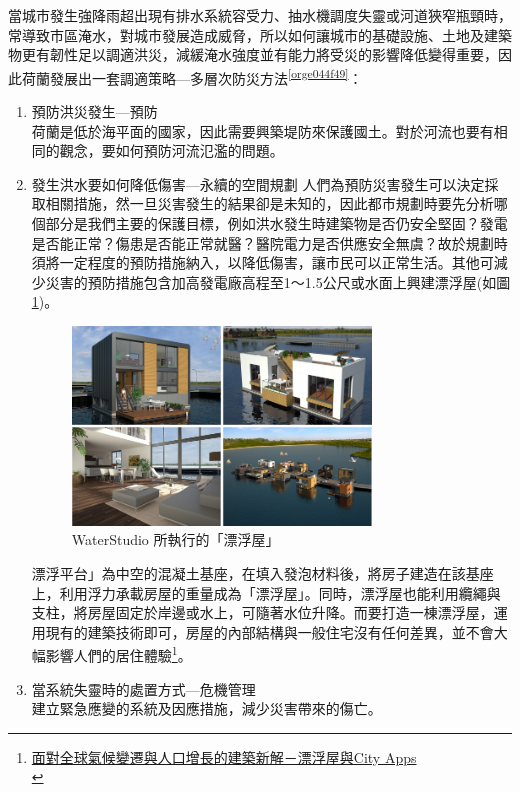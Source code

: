 \documentclass[a4paper,12pt]{article}
\begin{document}
\begin{enumerate}
\begin{enumerate}
當城市發生強降雨超出現有排水系統容受力、抽水機調度失靈或河道狹窄瓶頸時，常導致市區淹水，對城市發展造成威脅，所以如何讓城市的基礎設施、土地及建築物更有韌性足以調適洪災，減緩淹水強度並有能力將受災的影響降低變得重要，因此荷蘭發展出一套調適策略—多層次防災方法\textsuperscript{\ref{orge044f49}}：\\
\begin{enumerate}
\item 預防洪災發生—預防\\
荷蘭是低於海平面的國家，因此需要興築堤防來保護國土。對於河流也要有相同的觀念，要如何預防河流氾濫的問題。\\
\item 發生洪水要如何降低傷害—永續的空間規劃   人們為預防災害發生可以決定採取相關措施，然一旦災害發生的結果卻是未知的，因此都市規劃時要先分析哪個部分是我們主要的保護目標，例如洪水發生時建築物是否仍安全堅固？發電是否能正常？傷患是否能正常就醫？醫院電力是否供應安全無虞？故於規劃時須將一定程度的預防措施納入，以降低傷害，讓市民可以正常生活。其他可減少災害的預防措施包含加高發電廠高程至1～1.5公尺或水面上興建漂浮屋(如圖\ref{fig:Floating-1})。\\
\begin{figure}[htbp]
\centering
\includegraphics[width=300]{images/floatingx4.jpg}
\caption{\label{fig:Floating-1}WaterStudio 所執行的「漂浮屋」}
\end{figure}
漂浮平台」為中空的混凝土基座，在填入發泡材料後，將房子建造在該基座上，利用浮力承載房屋的重量成為「漂浮屋」。同時，漂浮屋也能利用纜繩與支柱，將房屋固定於岸邊或水上，可隨著水位升降。而要打造一棟漂浮屋，運用現有的建築技術即可，房屋的內部結構與一般住宅沒有任何差異，並不會大幅影響人們的居住體驗\footnote{\href{https://www.oranjeexpress.com/2013/09/29/\%E9\%9D\%A2\%E5\%B0\%8D\%E5\%85\%A8\%E7\%90\%83\%E6\%B0\%A3\%E5\%80\%99\%E8\%AE\%8A\%E9\%81\%B7\%E8\%88\%87\%E4\%BA\%BA\%E5\%8F\%A3\%E5\%A2\%9E\%E9\%95\%B7\%E7\%9A\%84\%E5\%BB\%BA\%E7\%AF\%89\%E6\%96\%B0\%E8\%A7\%A3-\%E6\%BC\%82\%E6\%B5\%AE\%E5\%B1\%8B\%E8\%88\%87/}{面對全球氣候變遷與人口增長的建築新解－漂浮屋與City Apps}\\}。\\
\item 當系統失靈時的處置方式—危機管理\\
建立緊急應變的系統及因應措施，減少災害帶來的傷亡。\\
\end{enumerate}


\end{enumerate}
\end{enumerate}
\end{document}
